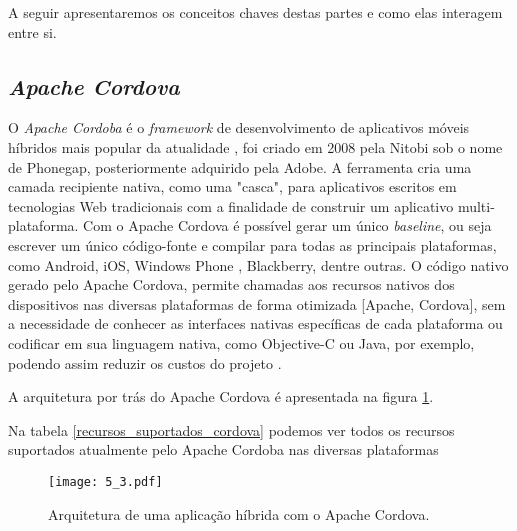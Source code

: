 A seguir apresentaremos os conceitos chaves destas partes e como elas interagem entre si.



\subsection{\textit{Apache Cordova}}
O \textit{Apache Cordoba} é o \textit{framework} de desenvolvimento de aplicativos móveis híbridos mais popular da atualidade \cite{article:palmiere}, foi criado em 2008 pela Nitobi sob o nome de Phonegap, posteriormente adquirido pela Adobe. A ferramenta cria uma camada recipiente nativa, como uma "casca", para aplicativos escritos em tecnologias Web tradicionais com a finalidade de construir um  aplicativo multi-plataforma.
Com o Apache Cordova é possível gerar um único \textit{baseline}, ou seja escrever um único código-fonte e compilar para todas as principais plataformas, como Android, iOS, Windows Phone , Blackberry, dentre outras.
O código nativo gerado pelo Apache Cordova, permite chamadas aos recursos nativos dos dispositivos nas diversas plataformas de forma otimizada [Apache, Cordova], sem a necessidade de conhecer as interfaces nativas específicas de cada plataforma ou codificar em sua linguagem nativa, como Objective-C ou Java, por exemplo, podendo assim reduzir os custos do projeto \cite{article:tian}.

A arquitetura por trás do Apache Cordova é apresentada na figura \ref{cordova}. 

Na tabela \ref{recursos_suportados_cordova} podemos ver todos os recursos suportados atualmente pelo Apache Cordoba nas diversas plataformas

\begin{figure}[H]
\centering
\texttt{[image: 5\_3.pdf]}
    \caption{Arquitetura de uma aplicação híbrida com o Apache Cordova. \cite{website:cordova-arch}}
    \label{cordova}
\end{figure}



